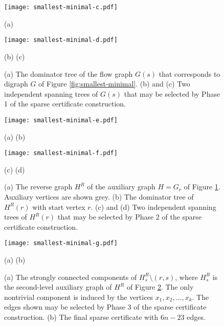 \documentclass[11pt]{article}
\begin{document}
\begin{figure}[h!]
\begin{center}
\texttt{[image: smallest-minimal-c.pdf]}
\end{center}
\hspace{7.5cm} (a)
\begin{center}
\texttt{[image: smallest-minimal-d.pdf]}
\end{center}
\hspace{3.5cm} (b) \hspace{6.8cm} (c)
\caption{(a)  The dominator tree of the flow graph $G(s)$ that corresponds to digraph $G$ of Figure \ref{fig:smallest-minimal}. (b) and (c) Two independent spanning trees of $G(s)$ that may be selected by Phase 1 of the sparse certificate construction.}
\label{fig:smallest-minimal-2}
\end{figure}

\begin{figure}[h!]
\begin{center}
\texttt{[image: smallest-minimal-e.pdf]}
\end{center}
\vspace{-0.2cm}
\hspace{4cm} (a) \hspace{7cm} (b)
\vspace{0.2cm}
\begin{center}
\texttt{[image: smallest-minimal-f.pdf]}
\end{center}
\hspace{4cm} (c) \hspace{7cm} (d)
\vspace{-0.2cm}
\caption{(a) The reverse graph $H^R$ of the auxiliary graph $H=G_r$ of Figure \ref{fig:smallest-minimal-2}. Auxiliary vertices are shown grey. (b) The dominator tree of $H^R(r)$ with start vertex $r$.
 (c) and (d)  Two independent spanning trees of $H^R(r)$ that may be selected by Phase 2 of the sparse certificate construction.
}
\label{fig:smallest-minimal-3}
\end{figure}

\begin{figure}[h!]
\begin{center}
\texttt{[image: smallest-minimal-g.pdf]}
\end{center}
\hspace{4cm} (a) \hspace{6.2cm} (b)
\caption{(a) The strongly connected components of $H^R_s \setminus (r,s)$, where $H^R_s$ is the second-level auxiliary graph of $H^R$ of Figure \ref{fig:smallest-minimal-3}. The only nontrivial component is induced by the vertices $x_1, x_2, \ldots, x_k$. The edges shown may be  selected by Phase 3 of the sparse certificate construction. (b) The final sparse certificate with $6n-23$ edges.}
\label{fig:smallest-minimal-4}
\end{figure}
\end{document}
